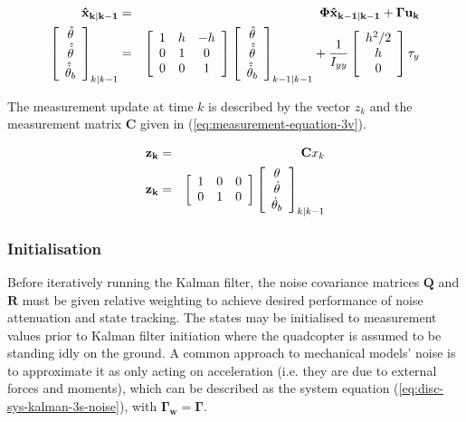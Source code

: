 \documentclass[a4paper]{report}
\begin{document}
\begin{eqnarray}
\mathbf{\hat{x}_{k|k-1}} & = & \mathbf{\Phi\hat{x}_{k-1|k-1}} + \mathbf{\Gamma u_{k}} \\
		\left[
      		\begin{array}{c}
      		\hat{\theta}\\
		\hat{\dot{\theta}}\\
		\hat{\dot{\theta}}_{b}
      		\end{array} \right]_{k|k-1}
		& = &
		\left[
		\begin{array}{c c c}
		1 &  h & -h \\
		0 & 1 & 0 \\
		0 & 0 & 1 \\
		\end{array} \right]
		\left[
		\begin{array}{c}
		\hat{\theta}\\
		\hat{\dot{\theta}}\\
		\hat{\dot{\theta}}_{b}
		\end{array} \right]_{k-1|k-1}
		+ 
		\dfrac{1}{I_{yy}}
		\left[
		\begin{array}{c}
		h^2 / 2\\
		h\\
		0
		\end{array} \right] 
		\tau_y \nonumber
		\label{eq:kalman-3sdisc}
\end{eqnarray}

The measurement update at time $k$ is described by the vector $z_k$ and the measurement matrix $\mathbf{C}$ given in (\ref{eq:measurement-equation-3v}).

\begin{eqnarray}
\label{eq:measurement-equation-3v}
\mathbf{z_k} & = & \mathbf{C} x_k \nonumber \\
\mathbf{z_{k}} & = &
\left[ \begin{array}{c c c}
1 & 0 & 0\\
0 & 1 & 0
\end{array} \right]
\left[
\begin{array}{c}
\theta\\
\dot{\theta}\\
\dot{\theta}_{b}
\end{array} \right]_{k|k-1}
\end{eqnarray}

		\subsubsection{Initialisation}
Before iteratively running the Kalman filter, the noise covariance matrices $\mathbf{Q}$ and $\mathbf{R}$ must be given relative weighting to achieve desired performance of noise attenuation and state tracking. The states may be initialised to measurement values prior to Kalman filter initiation where the quadcopter is assumed to be standing idly on the ground. A common approach to mechanical models' noise is to approximate it as only acting on acceleration (i.e. they are due to external forces and moments), which can be described as the system equation (\ref{eq:disc-sys-kalman-3s-noise}), with $\mathbf{\Gamma_w} = \mathbf{\Gamma}$.
\end{document}

